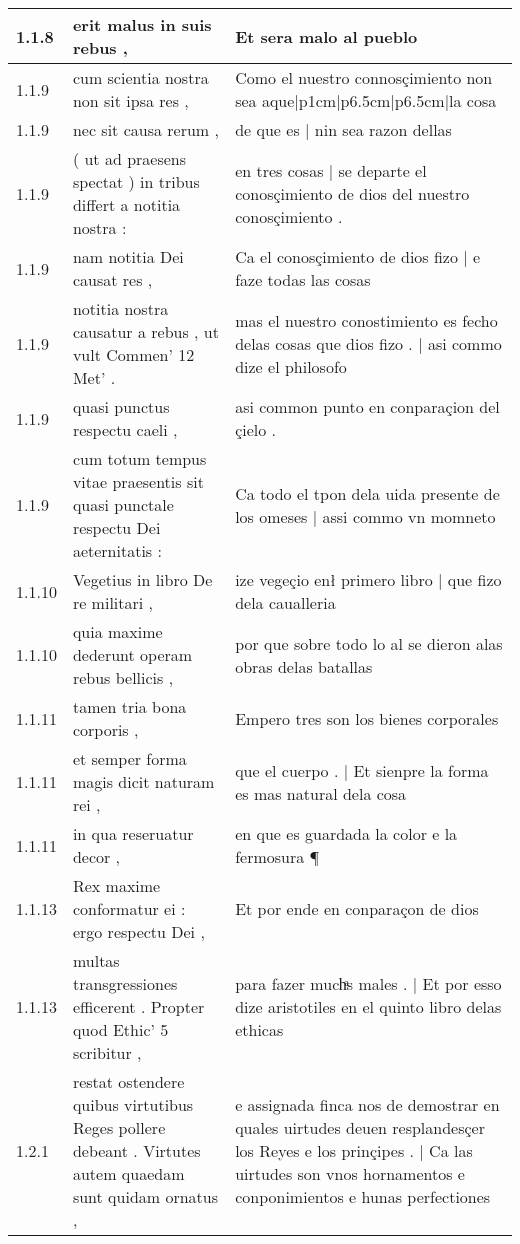 \begin{tabular}{|p{1cm}|p{6.5cm}|p{6.5cm}|}
1.1.8 & erit malus in suis rebus , & Et sera malo al pueblo \\\hline
1.1.9 & cum scientia nostra non sit ipsa res , & Como el nuestro connosçimiento non sea aque|p{1cm}|p{6.5cm}|p{6.5cm}|la cosa \\\hline
1.1.9 & nec sit causa rerum , & de que es | nin sea razon dellas \\\hline
1.1.9 & ( ut ad praesens spectat ) in tribus differt a notitia nostra : & en tres cosas | se departe el conosçimiento de dios del nuestro conosçimiento . \\\hline
1.1.9 & nam notitia Dei causat res , & Ca el conosçimiento de dios fizo | e faze todas las cosas \\\hline
1.1.9 & notitia nostra causatur a rebus , ut vult Commen’ 12 Met’ . & mas el nuestro conostimiento es fecho delas cosas que dios fizo . | asi commo dize el philosofo \\\hline
1.1.9 & quasi punctus respectu caeli , & asi common punto en conparaçion del çielo . \\\hline
1.1.9 & cum totum tempus vitae praesentis sit quasi punctale respectu Dei aeternitatis : & Ca todo el tpon dela uida presente de los omeses | assi commo vn momneto \\\hline
1.1.10 & Vegetius in libro De re militari , & ize vegeçio enł primero libro | que fizo dela caualleria \\\hline
1.1.10 & quia maxime dederunt operam rebus bellicis , & por que sobre todo lo al se dieron alas obras delas batallas \\\hline
1.1.11 & tamen tria bona corporis , & Empero tres son los bienes corporales \\\hline
1.1.11 & et semper forma magis dicit naturam rei , & que el cuerpo . | Et sienpre la forma es mas natural dela cosa \\\hline
1.1.11 & in qua reseruatur decor , & en que es guardada la color e la fermosura ¶ \\\hline
1.1.13 & Rex maxime conformatur ei : ergo respectu Dei , & Et por ende en conparaçon de dios \\\hline
1.1.13 & multas transgressiones efficerent . Propter quod Ethic’ 5 scribitur , & para fazer muchͣs males . | Et por esso dize aristotiles en el quinto libro delas ethicas \\\hline
1.2.1 & restat ostendere quibus virtutibus Reges pollere debeant . Virtutes autem quaedam sunt quidam ornatus , & e assignada finca nos de demostrar en quales uirtudes deuen resplandesçer los Reyes e los prinçipes . | Ca las uirtudes son vnos hornamentos e conponimientos e hunas perfectiones \\\hline

\end{tabular}
